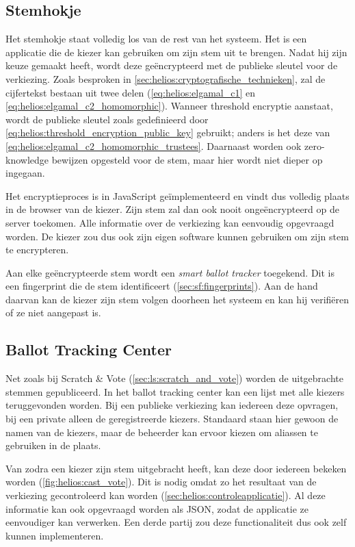 \subsection{Stemhokje}
\label{sec:helios:stemhokje}

Het stemhokje staat volledig los van de rest van het systeem. Het is een applicatie die de kiezer kan gebruiken om zijn stem uit te brengen. Nadat hij zijn keuze gemaakt heeft, wordt deze ge\"encrypteerd met de publieke sleutel voor de verkiezing. Zoals besproken in \ref{sec:helios:cryptografische_technieken}, zal de cijfertekst bestaan uit twee delen (\ref{eq:helios:elgamal_c1} en \ref{eq:helios:elgamal_c2_homomorphic}). Wanneer threshold encryptie aanstaat, wordt de publieke sleutel zoals gedefinieerd door \ref{eq:helios:threshold_encryption_public_key} gebruikt; anders is het deze van \ref{eq:helios:elgamal_c2_homomorphic_trustees}. Daarnaast worden ook zero-knowledge bewijzen opgesteld voor de stem, maar hier wordt niet dieper op ingegaan.

\npar Het encryptieproces is in JavaScript ge\"implementeerd en vindt dus volledig plaats in de browser van de kiezer. Zijn stem zal dan ook nooit onge\"encrypteerd op de server toekomen. Alle informatie over de verkiezing kan eenvoudig opgevraagd worden. De kiezer zou dus ook zijn eigen software kunnen gebruiken om zijn stem te encrypteren.

\npar Aan elke ge\"encrypteerde stem wordt een \textit{smart ballot tracker} toegekend. Dit is een fingerprint die de stem identificeert (\ref{sec:sf:fingerprints}). Aan de hand daarvan kan de kiezer zijn stem volgen doorheen het systeem en kan hij verifi\"eren of ze niet aangepast is.

\subsection{Ballot Tracking Center}
\label{sec:helios:ballot_tracking_center}

Net zoals bij Scratch \& Vote (\ref{sec:ls:scratch_and_vote}) worden de uitgebrachte stemmen gepubliceerd. In het ballot tracking center kan een lijst met alle kiezers teruggevonden worden. Bij een publieke verkiezing kan iedereen deze opvragen, bij een private alleen de geregistreerde kiezers. Standaard staan hier gewoon de namen van de kiezers, maar de beheerder kan ervoor kiezen om aliassen te gebruiken in de plaats.

\npar Van zodra een kiezer zijn stem uitgebracht heeft, kan deze door iedereen bekeken worden (\ref{fig:helios:cast_vote}). Dit is nodig omdat zo het resultaat van de verkiezing gecontroleerd kan worden (\ref{sec:helios:controleapplicatie}). Al deze informatie kan ook opgevraagd worden als JSON, zodat de applicatie ze eenvoudiger kan verwerken. Een derde partij zou deze functionaliteit dus ook zelf kunnen implementeren.

